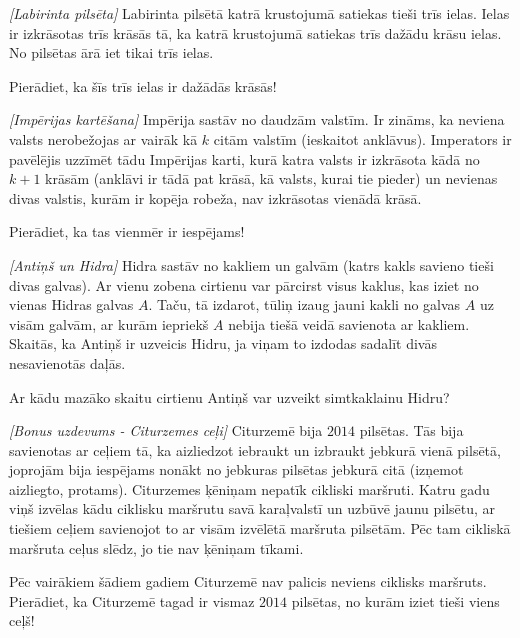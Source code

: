 \begin{problem}
\textit{[Labirinta pilsēta]}
Labirinta pilsētā katrā krustojumā satiekas tieši trīs ielas. Ielas ir izkrāsotas trīs krāsās tā, ka katrā krustojumā satiekas trīs dažādu krāsu ielas. No pilsētas ārā iet tikai trīs ielas. 

Pierādiet, ka šīs trīs ielas ir dažādās krāsās!
\end{problem}
%

\begin{problem}
\textit{[Impērijas kartēšana]}
Impērija sastāv no daudzām valstīm. Ir zināms, ka neviena valsts nerobežojas ar vairāk kā $k$ citām valstīm (ieskaitot anklāvus). Imperators ir pavēlējis uzzīmēt tādu Impērijas karti, kurā katra valsts ir izkrāsota kādā no $k+1$ krāsām (anklāvi ir tādā pat krāsā, kā valsts, kurai tie pieder) un nevienas divas valstis, kurām ir kopēja robeža, nav izkrāsotas vienādā krāsā. 

Pierādiet, ka tas vienmēr ir iespējams!

\end{problem}
%

\begin{problem}
\textit{[Antiņš un Hidra]}
Hidra sastāv no kakliem un galvām (katrs kakls savieno tieši divas galvas). Ar vienu zobena cirtienu var pārcirst visus kaklus, kas iziet no vienas Hidras galvas $A$. Taču, tā izdarot, tūliņ izaug jauni kakli no galvas $A$ uz visām galvām, ar kurām iepriekš $A$ nebija tiešā veidā savienota ar kakliem. 
Skaitās, ka Antiņš ir uzveicis Hidru, ja viņam to izdodas sadalīt divās nesavienotās daļās. 

Ar kādu mazāko skaitu cirtienu Antiņš var uzveikt simtkaklainu Hidru?

\end{problem}
%

\begin{problem}
\textit{[Bonus uzdevums - Citurzemes ceļi]}
Citurzemē bija $2014$ pilsētas. Tās bija savienotas ar ceļiem tā, ka aizliedzot iebraukt un izbraukt jebkurā vienā pilsētā, joprojām bija iespējams nonākt no jebkuras pilsētas jebkurā citā (izņemot aizliegto, protams). 
Citurzemes ķēniņam nepatīk cikliski maršruti. Katru gadu viņš izvēlas kādu ciklisku maršrutu savā karaļvalstī un uzbūvē jaunu pilsētu, ar tiešiem ceļiem savienojot to ar visām izvēlētā maršruta 
pilsētām. Pēc tam cikliskā maršruta ceļus slēdz, jo tie nav ķēniņam tīkami.

Pēc vairākiem šādiem gadiem Citurzemē nav palicis neviens ciklisks maršruts. Pierādiet, ka Citurzemē tagad ir vismaz $2014$ pilsētas, no kurām iziet tieši viens ceļš!

\end{problem}
%

